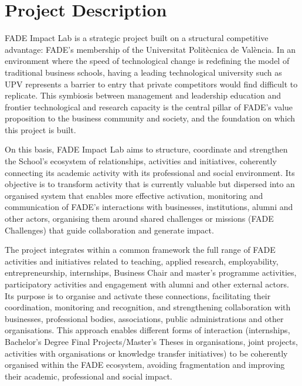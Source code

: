 \documentclass[11pt,a4paper]{scrreprt}
\begin{document}
\section{Project Description}

\small

\small
FADE Impact Lab is a strategic project built on a structural competitive advantage: FADE's membership of the Universitat Politècnica de València. In an environment where the speed of technological change is redefining the model of traditional business schools, having a leading technological university such as UPV represents a barrier to entry that private competitors would find difficult to replicate. This symbiosis between management and leadership education and frontier technological and research capacity is the central pillar of FADE's value proposition to the business community and society, and the foundation on which this project is built.

On this basis, FADE Impact Lab aims to structure, coordinate and strengthen the School's ecosystem of relationships, activities and initiatives, coherently connecting its academic activity with its professional and social environment. Its objective is to transform activity that is currently valuable but dispersed into an organised system that enables more effective activation, monitoring and communication of FADE's interactions with businesses, institutions, alumni and other actors, organising them around shared challenges or missions (FADE Challenges) that guide collaboration and generate impact.

The project integrates within a common framework the full range of FADE activities and initiatives related to teaching, applied research, employability, entrepreneurship, internships, Business Chair and master's programme activities, participatory activities and engagement with alumni and other external actors. Its purpose is to organise and activate these connections, facilitating their coordination, monitoring and recognition, and strengthening collaboration with businesses, professional bodies, associations, public administrations and other organisations. This approach enables different forms of interaction (internships, Bachelor's Degree Final Projects/Master's Theses in organisations, joint projects, activities with organisations or knowledge transfer initiatives) to be coherently organised within the FADE ecosystem, avoiding fragmentation and improving their academic, professional and social impact.
\end{document}
